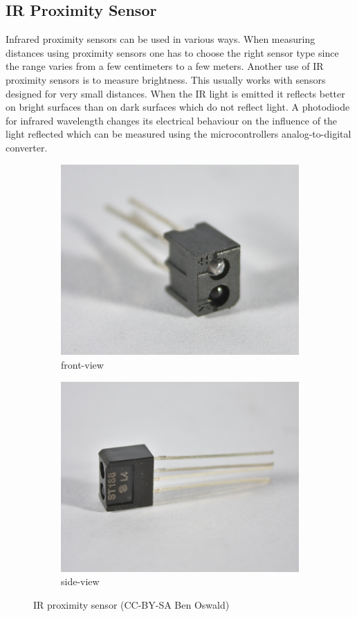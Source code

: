 \documentclass[11pt,a4paper]{article}
\begin{document}
\subsection{IR Proximity Sensor}
Infrared proximity sensors can be used in various ways. When measuring distances using proximity sensors one has to choose the right sensor type since the range varies from a few centimeters to a few meters. Another use of IR proximity sensors is to measure brightness. This usually works with sensors designed for very small distances. When the IR light is emitted it reflects better on bright surfaces than on dark surfaces which do not reflect light. A photodiode for infrared wavelength changes its electrical behaviour on the influence of the light reflected which can be measured using the microcontrollers analog-to-digital converter.

\begin{figure}[h!]
  \centering
  \begin{subfigure}{0.48\textwidth}
  \centering
  \includegraphics[width=0.9\linewidth]{images/30_proximity_front.jpg}
  \caption{front-view}
  \end{subfigure}
  \begin{subfigure}{0.48\textwidth}
  \centering
  \includegraphics[width=0.9\linewidth]{images/30_proximity_back.jpg}
  \caption{side-view}
  \end{subfigure}
  \caption{IR proximity sensor (CC-BY-SA Ben Oswald)}
\end{figure}
\end{document}
